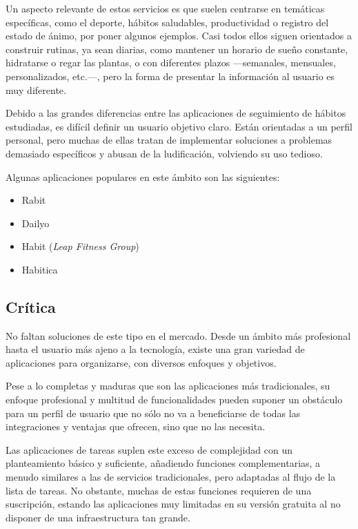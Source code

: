 \documentclass[10pt, a4paper]{aqademic}
\begin{document}
\medskip

Un aspecto relevante de estos servicios es que suelen centrarse en temáticas específicas, como el deporte, hábitos saludables, productividad o registro del estado de ánimo, por poner algunos ejemplos. Casi todos ellos siguen orientados a construir rutinas, ya sean diarias, como mantener un horario de sueño constante, hidratarse o regar las plantas, o con diferentes plazos ---semanales, mensuales, personalizados, etc.---, pero la forma de presentar la información al usuario es muy diferente. 

\medskip

Debido a las grandes diferencias entre las aplicaciones de seguimiento de hábitos estudiadas, es difícil definir un usuario objetivo claro. Están orientadas a un perfil personal, pero muchas de ellas tratan de implementar soluciones a problemas demasiado específicos y abusan de la ludificación, volviendo su uso tedioso.

\medskip

Algunas aplicaciones populares en este ámbito son las siguientes:

\begin{itemize}
	\item Rabit
	\item Dailyo
	\item Habit (\textit{Leap Fitness Group})
	\item Habitica
\end{itemize}


\subsection*{Crítica}

No faltan soluciones de este tipo en el mercado. Desde un ámbito más profesional hasta el usuario más ajeno a la tecnología, existe una gran variedad de aplicaciones para organizarse, con diversos enfoques y objetivos. 

Pese a lo completas y maduras que son las aplicaciones más tradicionales, su enfoque profesional y multitud de funcionalidades pueden suponer un obstáculo para un perfil de usuario que no sólo no va a beneficiarse de todas las integraciones y ventajas que ofrecen, sino que no las necesita. 

\medskip

Las aplicaciones de tareas suplen este exceso de complejidad con un planteamiento básico y suficiente, añadiendo funciones complementarias, a menudo similares a las de servicios tradicionales, pero adaptadas al flujo de la lista de tareas. No obstante, muchas de estas funciones requieren de una suscripción, estando las aplicaciones muy limitadas en su versión gratuita al no disponer de una infraestructura tan grande. 
\end{document}
